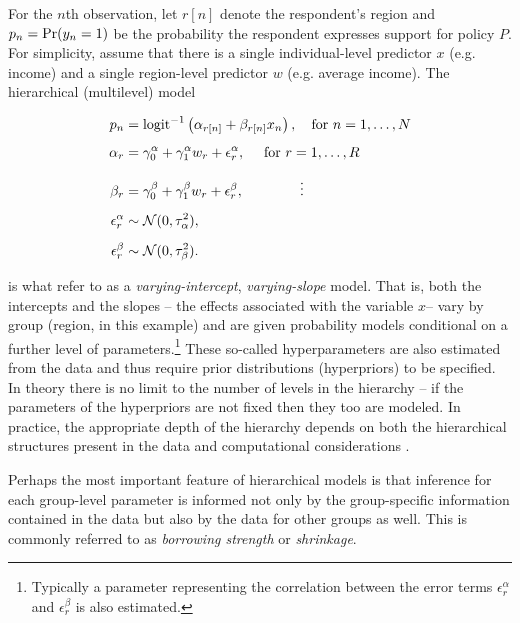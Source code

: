 For the $n$th observation, let $r[n]$ denote the respondent's region and $p_n = {\rm Pr}(y_n = 1)$ 
be the probability the respondent expresses support for policy $P$. For simplicity, assume that there 
is a single individual-level predictor $x$ (e.g. income) and a single region-level predictor $w$ 
(e.g. average income). The hierarchical (multilevel) model

%
\begin{align*}
p_n &= {\rm logit}^{-1}\left(\alpha_{r[n]} + \beta_{r[n]} x_n\right), \quad \text{for } n = 1, \dots, N \\[5pt]
 \alpha_r &= \gamma^\alpha_0 + \gamma^\alpha_1 w_r + \epsilon^\alpha_r, \quad \text{ for } r = 1, \dots, R \\[5pt]
  \beta_r &= \gamma^\beta_0 + \gamma^\beta_1 w_r + \epsilon^\beta_r, \qquad\qquad \vdots  \\[5pt]
   \epsilon^\alpha_r &\sim \mathcal{N}(0, \tau^2_\alpha), \\[5pt]
   \epsilon^\beta_r &\sim \mathcal{N}(0, \tau^2_\beta).
\end{align*}

\noindent is what  refer to as a {\it varying-intercept}, 
{\it varying-slope} model. That is, both the intercepts and the slopes -- the effects 
associated with the variable $x$-- vary by group (region, in this example) and 
are given probability models conditional on a further level of parameters.\footnote{
Typically a parameter representing the correlation between the error terms 
$\epsilon_r^\alpha$ and $\epsilon_r^\beta$ is also estimated.} 
These so-called hyperparameters 
are also estimated from the data and thus require prior distributions (hyperpriors) to be specified. 
In theory there is no limit to the number 
of levels in the hierarchy -- if the parameters of the hyperpriors are not fixed then they too are modeled. 
In practice, the appropriate depth of the hierarchy depends on both the hierarchical 
structures present in the data and computational considerations . 

Perhaps the most important feature of hierarchical models is that inference for each group-level 
parameter is informed not only by the group-specific information contained in the data but also 
by the data for other groups as well. This is commonly referred to as {\it borrowing strength} 
or {\it shrinkage}. 

